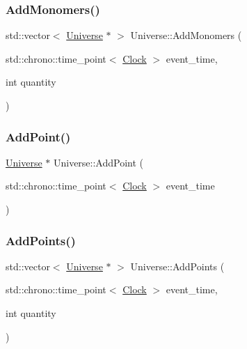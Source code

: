 \mbox{\label{classUniverse_a95fe7f99971bb2048121a7c4e87b9f79}} 
\subsubsection{\texorpdfstring{Add\+Monomers()}{AddMonomers()}}
{\footnotesize\ttfamily std\+::vector$<$ \mbox{\hyperlink{classUniverse}{Universe}} $\ast$ $>$ Universe\+::\+Add\+Monomers (\begin{DoxyParamCaption}\item[{std\+::chrono\+::time\+\_\+point$<$ \mbox{\hyperlink{universe_8h_a0ef8d951d1ca5ab3cfaf7ab4c7a6fd80}{Clock}} $>$}]{event\+\_\+time,  }\item[{int}]{quantity }\end{DoxyParamCaption})}

\mbox{\label{classUniverse_a8508b791c6997d8abcdcc037a6776734}} 
\subsubsection{\texorpdfstring{Add\+Point()}{AddPoint()}}
{\footnotesize\ttfamily \mbox{\hyperlink{classUniverse}{Universe}} $\ast$ Universe\+::\+Add\+Point (\begin{DoxyParamCaption}\item[{std\+::chrono\+::time\+\_\+point$<$ \mbox{\hyperlink{universe_8h_a0ef8d951d1ca5ab3cfaf7ab4c7a6fd80}{Clock}} $>$}]{event\+\_\+time }\end{DoxyParamCaption})}

\mbox{\label{classUniverse_aa48ced2078ba863723050d8283b3fa67}} 
\subsubsection{\texorpdfstring{Add\+Points()}{AddPoints()}}
{\footnotesize\ttfamily std\+::vector$<$ \mbox{\hyperlink{classUniverse}{Universe}} $\ast$ $>$ Universe\+::\+Add\+Points (\begin{DoxyParamCaption}\item[{std\+::chrono\+::time\+\_\+point$<$ \mbox{\hyperlink{universe_8h_a0ef8d951d1ca5ab3cfaf7ab4c7a6fd80}{Clock}} $>$}]{event\+\_\+time,  }\item[{int}]{quantity }\end{DoxyParamCaption})}


